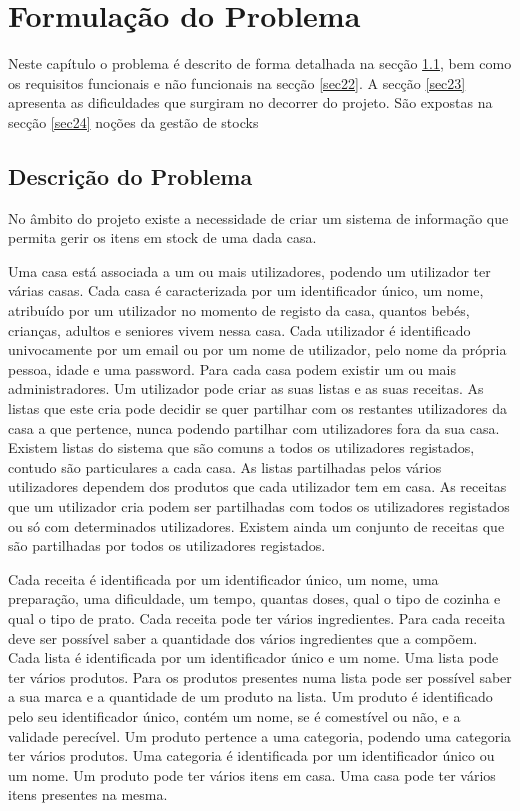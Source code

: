 %
%
\chapter{Formulação do Problema } \label{cap2}

Neste capítulo o problema é descrito de forma detalhada na secção \ref{sec21}, bem como os requisitos funcionais e não funcionais na secção \ref{sec22}. A secção \ref{sec23} apresenta as dificuldades que surgiram no decorrer do projeto. São expostas na secção \ref{sec24} noções da gestão de stocks 


%
%
\section{Descrição do Problema} \label{sec21}
No âmbito do projeto existe a necessidade de criar um sistema de informação que permita gerir os itens em stock de uma dada casa.

Uma casa está associada a um ou mais utilizadores, podendo um utilizador ter várias casas. Cada casa é caracterizada por um identificador único, um nome, atribuído por um utilizador no momento de registo da casa, quantos bebés, crianças, adultos e seniores vivem nessa casa. Cada utilizador é identificado univocamente por um email ou por um nome de utilizador, pelo nome da própria pessoa, idade e uma password. Para cada casa podem existir um ou mais administradores. Um utilizador pode criar as suas listas e as suas receitas. As listas que este cria pode decidir se quer partilhar com os restantes utilizadores da casa a que pertence, nunca podendo partilhar com utilizadores fora da sua casa. Existem listas do sistema que são comuns a todos os utilizadores registados, contudo são particulares a cada casa. As listas partilhadas pelos vários utilizadores dependem dos produtos que cada utilizador tem em casa. As receitas que um utilizador cria podem ser partilhadas com todos os utilizadores registados ou só com determinados utilizadores. Existem ainda um conjunto de receitas que são partilhadas por todos os utilizadores registados.

Cada receita é identificada por um identificador único, um nome, uma preparação, uma dificuldade, um tempo, quantas doses, qual o tipo de cozinha e qual o tipo de prato. Cada receita pode ter vários ingredientes. Para cada receita deve ser possível saber a quantidade dos vários ingredientes que a compõem.
Cada lista é identificada por um identificador único e um nome. Uma lista pode ter vários produtos. Para os produtos presentes numa lista pode ser possível saber a sua marca e a quantidade de um produto na lista. Um produto é identificado pelo seu identificador único, contém um nome, se é comestível ou não, e a validade perecível. Um produto pertence a uma categoria, podendo uma categoria ter vários produtos. Uma categoria é identificada por um identificador único ou um nome. Um produto pode ter vários itens em casa. Uma casa pode ter vários itens presentes na mesma. 

